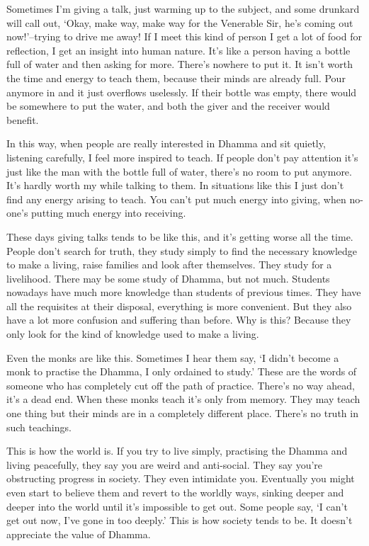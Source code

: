 Sometimes I'm giving a talk, just warming up to the subject, and some drunkard will call out, `Okay, make way, make way for the Venerable Sir, he's coming out now!'--trying to drive me away! If I meet this kind of person I get a lot of food for reflection, I get an insight into human nature. It's like a person having a bottle full of water and then asking for more. There's nowhere to put it. It isn't worth the time and energy to teach them, because their minds are already full. Pour anymore in and it just overflows uselessly. If their bottle was empty, there would be somewhere to put the water, and both the giver and the receiver would benefit.

In this way, when people are really interested in Dhamma and sit quietly, listening carefully, I feel more inspired to teach. If people don't pay attention it's just like the man with the bottle full of water, there's no room to put anymore. It's hardly worth my while talking to them. In situations like this I just don't find any energy arising to teach. You can't put much energy into giving, when no-one's putting much energy into receiving.

These days giving talks tends to be like this, and it's getting worse all the time. People don't search for truth, they study simply to find the necessary knowledge to make a living, raise families and look after themselves. They study for a livelihood. There may be some study of Dhamma, but not much. Students nowadays have much more knowledge than students of previous times. They have all the requisites at their disposal, everything is more convenient. But they also have a lot more confusion and suffering than before. Why is this? Because they only look for the kind of knowledge used to make a living.

Even the monks are like this. Sometimes I hear them say, `I didn't become a monk to practise the Dhamma, I only ordained to study.' These are the words of someone who has completely cut off the path of \mbox{practice.} There's no way ahead, it's a dead end. When these monks teach it's only from memory. They may teach one thing but their minds are in a completely different place. There's no truth in such teachings.

This is how the world is. If you try to live simply, practising the Dhamma and living peacefully, they say you are weird and anti-social. They say you're obstructing progress in society. They even intimidate you. Eventually you might even start to believe them and revert to the worldly ways, sinking deeper and deeper into the world until it's impossible to get out. Some people say, `I can't get out now, I've gone in too deeply.' This is how society tends to be. It doesn't appreciate the value of Dhamma.

